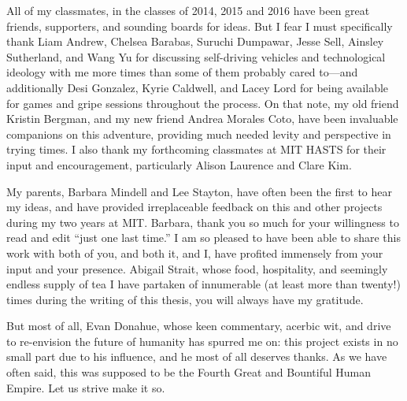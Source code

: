 All of my classmates, in the classes of 2014, 2015 and 2016 have been great
friends, supporters, and sounding boards for ideas. But I fear I must
specifically thank Liam Andrew, Chelsea Barabas, Suruchi Dumpawar,
Jesse Sell, Ainsley Sutherland, and Wang Yu for discussing
self-driving vehicles and technological ideology with me 
more times than some of them probably cared to---and additionally Desi
Gonzalez, Kyrie Caldwell, and Lacey Lord for being available for
games and gripe sessions throughout the process. On that note, my old
friend Kristin Bergman, and my new friend Andrea Morales Coto, have
been invaluable companions on this adventure, providing much needed
levity and perspective in trying times. I also thank my forthcoming
classmates at MIT HASTS for their input and encouragement,
particularly Alison Laurence and Clare Kim.

My parents, Barbara Mindell and Lee Stayton, have often been the first
to hear my ideas, and have provided irreplaceable feedback
on this and other projects during my two years at MIT. Barbara, thank
you so much for your willingness to read and edit ``just one last
time.'' I am so pleased 
to have been able to share this work with both of you, and both it, and I,
have profited immensely from your input and your presence. Abigail
Strait, whose food, hospitality, and seemingly endless supply of tea I have
partaken of innumerable (at least more than twenty!) times during the
writing of this thesis, you will always have my gratitude.

But most of all, Evan Donahue, whose keen commentary, acerbic wit, and
drive to re-envision the future of humanity has spurred me on: this
project exists in no small part due to his influence, and he most of
all deserves thanks. As we have 
often said, this was supposed to be the Fourth Great and Bountiful
Human Empire. Let us strive make it so.

 

